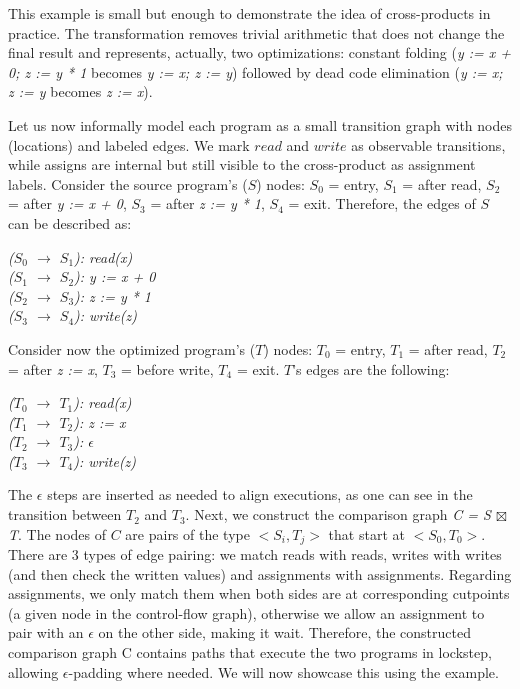 This example is small but enough to demonstrate the idea of cross-products in practice.
The transformation removes trivial arithmetic that does not change the final result and represents, actually, two optimizations: constant folding (\emph{y := x + 0; z := y * 1} becomes \emph{y := x; z := y}) followed by dead code elimination (\emph{y := x; z := y} becomes \emph{z := x}).

Let us now informally model each program as a small transition graph with nodes (locations) and labeled edges.
We mark $read$ and $write$ as observable transitions, while assigns are internal but still visible to the cross-product as assignment labels.
Consider the source program's ($S$) nodes: $S_0$ = entry, $S_1$ = after read, $S_2$ = after \emph{y := x + 0}, $S_3$ = after \emph{z := y * 1}, $S_4$ = exit.
Therefore, the edges of $S$ can be described as:
\begin{tabbing}
  \emph{($S_0$ $\rightarrow$ $S_1$): read(x)} \\
  \emph{($S_1$ $\rightarrow$ $S_2$): y := x + 0} \\
  \emph{($S_2$ $\rightarrow$ $S_3$): z := y * 1} \\
  \emph{($S_3$ $\rightarrow$ $S_4$): write(z)}
  \label{tabbing:cross_products_transitions_s}
\end{tabbing}

Consider now the optimized program's ($T$) nodes: $T_0$ = entry, $T_1$ = after read, $T_2$ = after \emph{z := x}, $T_3$ = before write, $T_4$ = exit.
$T$'s edges are the following:
\begin{tabbing}
  \emph{($T_0$ $\rightarrow$ $T_1$): read(x)} \\
  \emph{($T_1$ $\rightarrow$ $T_2$): z := x} \\
  \emph{($T_2$ $\rightarrow$ $T_3$): $\epsilon$} \\
  \emph{($T_3$ $\rightarrow$ $T_4$): write(z)}
  \label{tabbing:cross_products_example_transitions_t}
\end{tabbing}

The $\epsilon$ steps are inserted as needed to align executions, as one can see in the transition between $T_2$ and $T_3$.
Next, we construct the comparison graph \emph{C = S $\boxtimes$ T}.
The nodes of $C$ are pairs of the type $<S_i, T_j>$ that start at $<S_0, T_0>$.
There are 3 types of edge pairing: we match reads with reads, writes with writes (and then check the written values) and assignments with assignments.
Regarding assignments, we only match them when both sides are at corresponding cutpoints (a given node in the control-flow graph), otherwise we allow an assignment to pair with an $\epsilon$ on the other side, making it wait.
Therefore, the constructed comparison graph C contains paths that execute the two programs in lockstep, allowing $\epsilon$-padding where needed.
We will now showcase this using the example.


